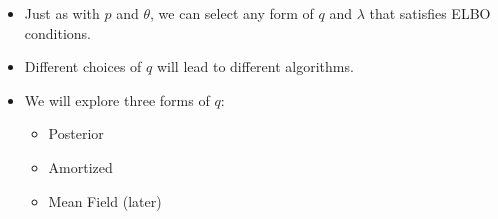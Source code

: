 







\begin{frame}
\begin{itemize}
    
    \item Just as with $p$ and $\theta$, we can select any form of $q$ and $\lambda$ that satisfies ELBO conditions. 
    \item Different choices of $q$ will lead to different algorithms.
    \item We will explore three forms of $q$: 
    \begin{itemize}
        \item Posterior
        \item Amortized
        \item Mean Field (later)
    \end{itemize}
\end{itemize}
\end{frame}

